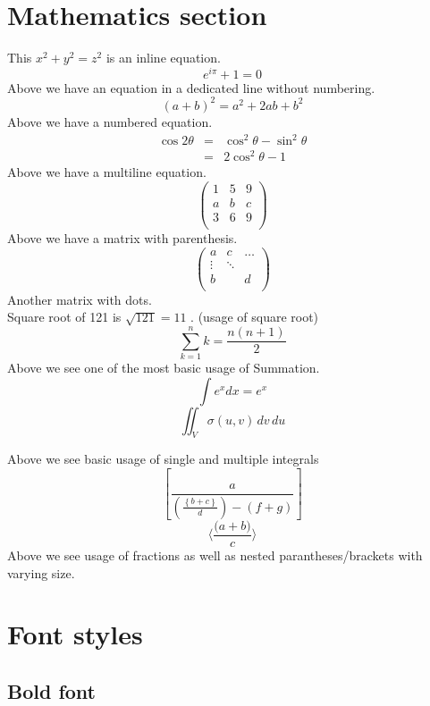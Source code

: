\documentclass{article}
\begin{document}
\section{Mathematics section}
\Large
This $x^2+y^2=z^2$ is an inline equation.
$$e^{i\pi} +1 = 0$$
Above we have an equation in a dedicated line without numbering.
\begin{equation}
    (a + b)^2= a^2+2ab+b^2
\end{equation}
Above we have a numbered equation.
\begin{eqnarray*}
    \cos 2\theta & =  & \cos^2 \theta - \sin^2 \theta \\
                 & =  & 2 \cos^2 \theta -1
\end{eqnarray*}
Above we have a multiline equation. \\
\[
\begin{pmatrix}
1 & 5 & 9 \\
a & b & c \\
3 & 6 & 9 \\
\end{pmatrix}
\]
Above we have a matrix with parenthesis.
\[
\begin{pmatrix}
a & c & \dots \\
\vdots & \ddots &  \\
b &  & d \\
\end{pmatrix}
\]
Another matrix with dots. \\
Square root of 121 is $\sqrt{121}= 11$ . (usage of square root)\\
$$\sum_{k=1}^{n} k = \frac{n(n+1)}{2}$$ 
Above we see one of the most basic usage of Summation.
\newpage
$$\int e^x dx = e^x$$
$$\iint_V \sigma(u,v) \,dv \,du$$

Above we see basic usage of single and multiple integrals
\[ 
\left[  \frac{ a } { \left( \frac { \left\{ b + c \right\} }{d} \right)  - (f+g) }  \right]
\]
\[ 
 \Bigg \langle \frac{ \big( a+b \big) } { c }\Bigg \rangle
\]
Above we see usage of fractions as well as nested parantheses/brackets with varying size. \\

\section{Font styles}
\subsection{Bold font}
\textbf{\blindtext}\\
\end{document}
